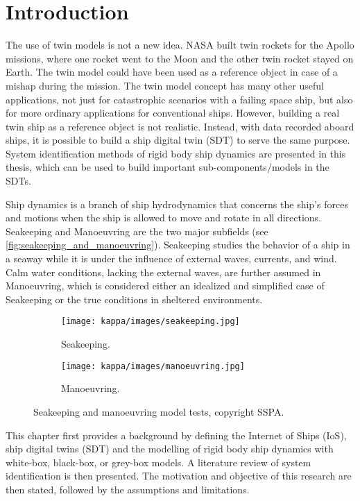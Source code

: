 \chapter{Introduction}
The use of twin models is not a new idea. NASA built twin rockets for the Apollo missions, where one rocket went to the Moon and the other twin rocket stayed on Earth.
The twin model could have been used as a reference object in case of a mishap during the mission.  
The twin model concept has many other useful applications, not just for catastrophic scenarios with a failing space ship, but also for more ordinary applications for conventional ships. However, building a real twin ship as a reference object is not realistic. Instead, with data recorded aboard ships, it is possible to build a ship digital twin (SDT) to serve the same purpose.
System identification methods of rigid body ship dynamics are presented in this thesis, which can be used to build important sub-components/models in the SDTs. 

Ship dynamics is a branch of ship hydrodynamics that concerns the ship's forces and motions when the ship is allowed to move and rotate in all directions. Seakeeping and Manoeuvring are the two major subfields (see \autoref{fig:seakeeping_and_manoeuvring}). Seakeeping studies the  behavior of a ship in a seaway while it is under the influence of external waves, currents, and wind. Calm water conditions, lacking the external waves, are further assumed in Manoeuvring, which is considered either an idealized and simplified case of Seakeeping or the true conditions in sheltered environments.
\begin{figure}[h]
    \centering
    \begin{subfigure}[b]{0.45\textwidth}
         \centering
         \texttt{[image: kappa/images/seakeeping.jpg]}
         \caption{Seakeeping.}
         \label{fig:seakeeping}
     \end{subfigure}
     \hfill
     \begin{subfigure}[b]{0.45\textwidth}
         \centering
         \texttt{[image: kappa/images/manoeuvring.jpg]}
         \caption{Manoeuvring.}
         \label{fig:manoeuvring}
     \end{subfigure}
     \hfill
    \caption{Seakeeping and manoeuvring model tests, copyright SSPA.}
    \label{fig:seakeeping_and_manoeuvring}
\end{figure}
This chapter first provides a background by defining the Internet of Ships (IoS), ship digital twins (SDT) and the modelling of rigid body ship dynamics with white-box, black-box, or grey-box models. A literature review of system identification is then presented.
The motivation and objective of this research are then stated, followed by the assumptions and limitations.
